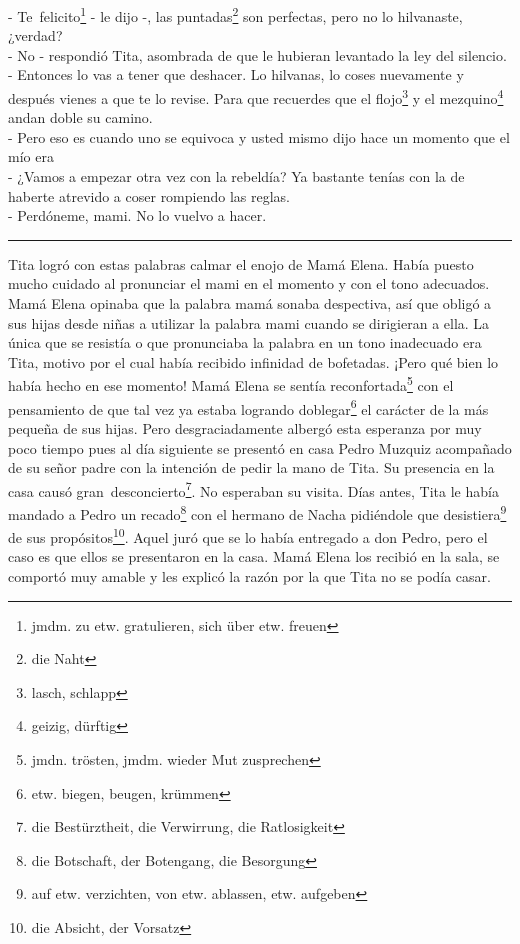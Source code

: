 - Te~felicito\footnote{jmdm. zu etw. gratulieren,  sich über etw. freuen} - le dijo -, %
las puntadas\footnote{die Naht} son perfectas, pero no lo %
hilvanaste, ¿verdad? %
\\- No - respondió Tita, asombrada de que le hubieran levantado la ley del %
silencio. %
\\- Entonces lo vas a tener que deshacer. Lo hilvanas, lo coses nuevamente %
y después vienes a que te lo revise. Para que recuerdes que el flojo\footnote{lasch, schlapp} %
y el mezquino\footnote{geizig, dürftig} andan doble su camino. %
\\- Pero eso es cuando uno se equivoca y usted mismo dijo hace un momento %
que el mío era \ndots %
\\- ¿Vamos a empezar otra vez con la rebeldía? Ya bastante tenías con la de %
haberte atrevido a coser rompiendo las reglas. %
\\- Perdóneme, mami. No lo vuelvo a hacer. \\
\rule{1em}{0pt}Tita logró con estas palabras calmar el enojo de Mamá Elena. Había
puesto mucho cuidado al pronunciar el \glqq{}mami\grqq{} en el momento y con el tono
adecuados. Mamá Elena opinaba que la palabra \glqq{}mamá\grqq{} sonaba despectiva, así
que obligó a sus hijas desde niñas a utilizar la palabra \glqq{}mami\grqq{} cuando
se dirigieran a ella. La única que se resistía o que pronunciaba la
palabra en un tono inadecuado era Tita, motivo por el cual había
recibido infinidad de bofetadas. ¡Pero qué bien lo había hecho en ese
momento! Mamá Elena se sentía reconfortada\footnote{jmdn. trösten, jmdm. wieder Mut zusprechen}
con el pensamiento de que tal vez ya estaba logrando doblegar\footnote{etw. biegen, beugen, krümmen} el carácter de
la más pequeña de sus hijas. Pero desgraciadamente albergó esta esperanza
por muy poco tiempo pues al día siguiente se presentó en casa Pedro Muzquiz
acompañado de su señor padre con la intención de pedir la mano de Tita.
Su presencia en la casa causó gran~desconcierto\footnote{die Bestürztheit, die Verwirrung, die Ratlosigkeit}.
No esperaban su visita. Días antes, Tita le había mandado a Pedro un recado\footnote{die Botschaft, der Botengang, die Besorgung}
con el hermano de Nacha pidiéndole que desistiera\footnote{auf etw. verzichten, von etw. ablassen, etw. aufgeben}
de sus propósitos\footnote{die Absicht, der Vorsatz}. Aquel
juró que se lo había entregado a don Pedro, pero el caso es que ellos
se presentaron en la casa. Mamá Elena los recibió en la sala, se comportó
muy amable y les explicó la razón por la que Tita no se podía casar.
